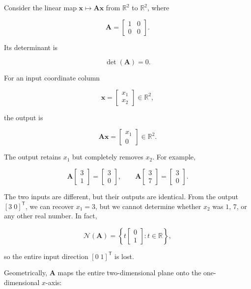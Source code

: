\documentclass[
  australian,
  12pt,
  letterpaper,
  DIV=11,
  numbers=noendperiod,
  twoside]{scrreprt}
\begin{document}
Consider the linear map \(\mathbf x\mapsto\mathbf A\mathbf x\) from
\(\mathbb R^2\) to \(\mathbb R^2\), where

\[
\mathbf A
=
\begin{bmatrix}
1&0\\
0&0
\end{bmatrix}.
\]

Its determinant is

\[
\det(\mathbf A)=0.
\]

For an input coordinate column

\[
\mathbf x
=
\begin{bmatrix}
x_1\\
x_2
\end{bmatrix}
\in\mathbb R^2,
\]

the output is

\[
\mathbf A\mathbf x
=
\begin{bmatrix}
x_1\\
0
\end{bmatrix}
\in\mathbb R^2.
\]

The output retains \(x_1\) but completely removes \(x_2\). For example,

\[
\mathbf A
\begin{bmatrix}
3\\
1
\end{bmatrix}
=
\begin{bmatrix}
3\\
0
\end{bmatrix},
\qquad
\mathbf A
\begin{bmatrix}
3\\
7
\end{bmatrix}
=
\begin{bmatrix}
3\\
0
\end{bmatrix}.
\]

The two inputs are different, but their outputs are identical. From the
output \([3\;0]^{\mathsf T}\), we can recover \(x_1=3\), but we cannot
determine whether \(x_2\) was \(1\), \(7\), or any other real number. In
fact,

\[
\mathcal N(\mathbf A)
=
\left\{
 t
 \begin{bmatrix}
 0\\
 1
 \end{bmatrix}
 :t\in\mathbb R
\right\},
\]

so the entire input direction \([0\;1]^{\mathsf T}\) is lost.

Geometrically, \(\mathbf A\) maps the entire two-dimensional plane onto
the one-dimensional \(x\)-axis:
\end{document}
